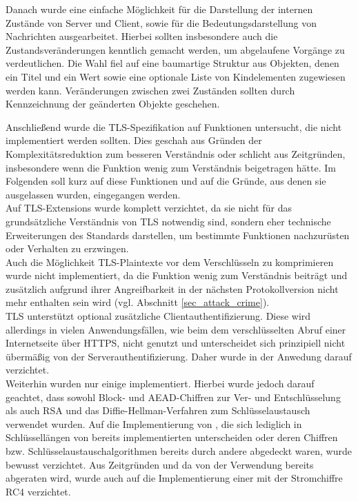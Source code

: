 Danach wurde eine einfache Möglichkeit für die Darstellung der internen Zustände von Server und Client, sowie für die Bedeutungsdarstellung von Nachrichten ausgearbeitet. Hierbei sollten insbesondere auch die Zustandsveränderungen kenntlich gemacht werden, um abgelaufene Vorgänge zu verdeutlichen. Die Wahl fiel auf eine baumartige Struktur aus Objekten, denen ein Titel und ein Wert sowie eine optionale Liste von Kindelementen zugewiesen werden kann. Veränderungen zwischen zwei Zuständen sollten durch Kennzeichnung der geänderten Objekte geschehen.


Anschließend wurde die TLS-Spezifikation auf Funktionen untersucht, die nicht implementiert werden sollten. Dies geschah aus Gründen der Komplexitätsreduktion zum besseren Verständnis oder schlicht aus Zeitgründen, insbesondere wenn die Funktion wenig zum Verständnis beigetragen hätte. Im Folgenden soll kurz auf diese Funktionen und auf die Gründe, aus denen sie ausgelassen wurden, eingegangen werden.\\
Auf TLS-Extensions wurde komplett verzichtet, da sie nicht für das grundsätzliche Verständnis von TLS notwendig sind, sondern eher technische Erweiterungen des Standards darstellen, um bestimmte Funktionen nachzurüsten oder Verhalten zu erzwingen.\\
Auch die Möglichkeit TLS-Plaintexte vor dem Verschlüsseln zu komprimieren wurde nicht implementiert, da die Funktion wenig zum Verständnis beiträgt und zusätzlich aufgrund ihrer Angreifbarkeit in der nächsten Protokollversion nicht mehr enthalten sein wird (vgl. Abschnitt \ref{sec_attack_crime}).\\
TLS unterstützt optional zusätzliche Clientauthentifizierung. Diese wird allerdings in vielen Anwendungsfällen, wie beim dem verschlüsselten Abruf einer Internetseite über HTTPS, nicht genutzt und unterscheidet sich prinzipiell nicht übermäßig von der Serverauthentifizierung. Daher wurde in der Anwedung darauf verzichtet.\\
Weiterhin wurden nur einige \ciphersuites implementiert. Hierbei wurde jedoch darauf geachtet, dass sowohl Block- und AEAD-Chiffren zur Ver- und Entschlüsselung als auch RSA und das Diffie-Hellman-Verfahren zum Schlüsselaustausch verwendet wurden. Auf die Implementierung von \ciphersuites, die sich lediglich in Schlüssellängen von bereits implementierten \ciphersuites unterscheiden oder deren Chiffren bzw. Schlüsselaustauschalgorithmen bereits durch andere \ciphersuites abgedeckt waren, wurde bewusst verzichtet. Aus Zeitgründen und da von der Verwendung bereits abgeraten wird, wurde auch auf die Implementierung einer \ciphersuite{} mit der Stromchiffre RC4 verzichtet.\\
